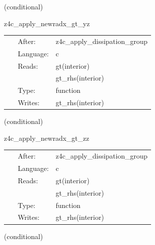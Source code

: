 \documentclass{article}
\begin{document}
\vspace{5mm}

   (conditional) 

\hspace{5mm} z4c\_apply\_newradx\_gt\_yz 



\hspace{5mm}

 \begin{tabular*}{160mm}{cll} 
~ & After:  & z4c\_apply\_dissipation\_group \\ 
~ & Language:  & c \\ 
~ & Reads:  & gt(interior) \\ 
~& ~ &gt\_rhs(interior)\\ 
~ & Type:  & function \\ 
~ & Writes:  & gt\_rhs(interior) \\ 
\end{tabular*} 


\vspace{5mm}

   (conditional) 

\hspace{5mm} z4c\_apply\_newradx\_gt\_zz 



\hspace{5mm}

 \begin{tabular*}{160mm}{cll} 
~ & After:  & z4c\_apply\_dissipation\_group \\ 
~ & Language:  & c \\ 
~ & Reads:  & gt(interior) \\ 
~& ~ &gt\_rhs(interior)\\ 
~ & Type:  & function \\ 
~ & Writes:  & gt\_rhs(interior) \\ 
\end{tabular*} 


\vspace{5mm}

   (conditional) 
\end{document}
